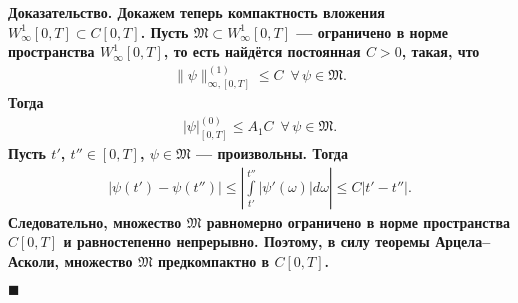 \documentclass{report}
\newenvironment{Proof}{\par\noindent\bf Доказательство.\rm}{ $\blacksquare$\par}
\begin{document}
\begin{Proof}
Докажем теперь компактность вложения $W^1_\infty[0,T]\subset C[0,T]$. Пусть $\mathfrak{M}\subset W^1_\infty[0,T]$ --- ограничено в норме пространства $W^1_\infty[0,T]$, то есть найдётся
постоянная $C>0$, такая, что
\begin{gather*}
\|\psi\|_{\infty,[0,T]}^{(1)}\leqslant C\,\,\,\forall\,\psi\in\mathfrak{M}.
\end{gather*}
Тогда
\begin{gather*}
\pmb{|}\psi\pmb{|}^{(0)}_{[0,T]}\leqslant A_1C\,\,\,\forall\,\psi\in\mathfrak{M}.
\end{gather*}
Пусть $t'$, $t''\in[0,T]$, $\psi\in\mathfrak{M}$ --- произвольны. Тогда
\begin{gather*}
|\psi(t')-\psi(t'')|\leqslant\left|\int\limits_{t'}^{t''}|\psi'(\omega)|d\omega\right|\leqslant C|t'-t''|.
\end{gather*}
Следовательно, множество $\mathfrak{M}$ равномерно ограничено в норме пространства $C[0,T]$ и равностепенно непрерывно. Поэтому, в силу
теоремы Арцела--Асколи, множество $\mathfrak{M}$ предкомпактно в $C[0,T]$.



\end{Proof}
\end{document}

